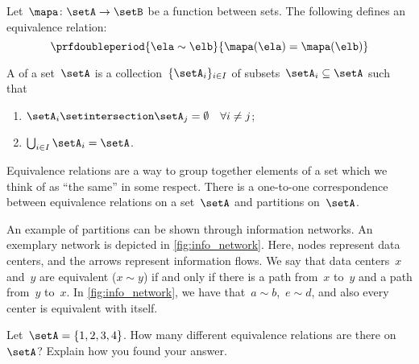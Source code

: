 \begin{example}
	Let~$\mapa\colon \setA\to \setB$ be a function between sets.
	The following defines an equivalence relation:
	\begin{equation*}
		\prfdoubleperiod{
			\ela\sim \elb
		}{
			\mapa(\ela)=\mapa(\elb)
		}
	\end{equation*}
\end{example}

\begin{ctdefinition}[Partition]
	\label{def:partition}
	A \emph{} of a set~$\setA$ is a collection~$\{\setA_i\}_{i\in I}$ of subsets~$\setA_i\subseteq \setA$ such that
	\begin{enumerate}
		\item $\setA_i\setintersection \setA_j=\emptyset \quad \forall i\neq j$;
		\item $\bigcup_{i\in I}\setA_i=\setA$.
	\end{enumerate}
\end{ctdefinition}

\begin{remark}
	Equivalence relations are a way to group together elements of a set which we think of as ``the same'' in some respect.
	There is a one-to-one correspondence between equivalence relations on a set~$\setA$ and partitions on~$\setA$.
\end{remark}

\begin{marginfigure}
	\centering
	\caption{
		\label{fig:info_network}
	}
\end{marginfigure}

\begin{example}
	An example of partitions can be shown through information networks.
	An exemplary network is depicted in \cref{fig:info_network}.
	Here, nodes represent data centers, and the arrows represent information flows.
	We say that data centers~$x$ and~$y$ are equivalent ($x\sim y$) if and only if there is a path from~$x$ to~$y$ and a path from~$y$ to~$x$.
	In \cref{fig:info_network}, we have that~$a\sim b$,~$e\sim d$, and also every center is equivalent with itself.
\end{example}

\vfill
\begin{gradedexercise}
	\label{ex:CountingEquivalenceRelations}
	Let~$\setA = \{ 1, 2, 3, 4 \}$.
	How many different equivalence relations are there on $\setA$?
	Explain how you found your answer.
\end{gradedexercise}

